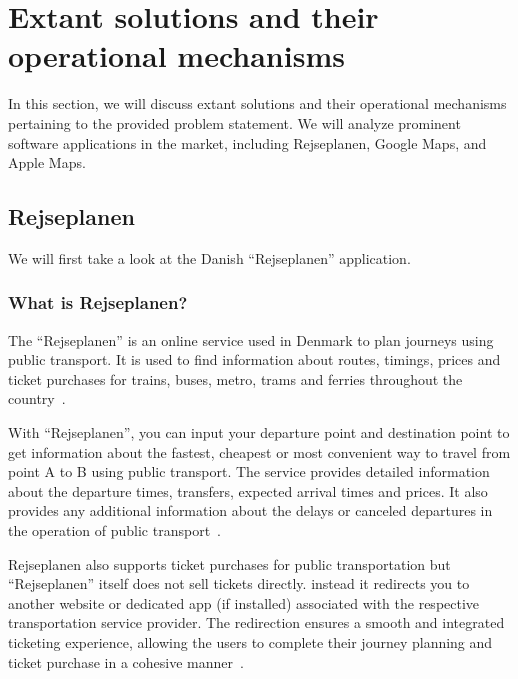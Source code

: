 \section{Extant solutions and their operational mechanisms}\label{sec:extant-solutions-and-their-operational-mechanisms}

In this section, we will discuss extant solutions and their operational mechanisms pertaining to the provided problem
statement.
We will analyze prominent software applications in the market, including Rejseplanen, Google Maps, and Apple Maps.

\subsection{Rejseplanen}\label{subsec:rejseplanen2}

We will first take a look at the Danish ``Rejseplanen'' application.

\subsubsection{What is Rejseplanen?}

The ``Rejseplanen'' is an online service used in Denmark to plan journeys using public transport.
It is used to find information about routes, timings, prices and ticket purchases for trains, buses, metro, trams and
ferries throughout the country~\cite{rejseplanen2023}.

With ``Rejseplanen'', you can input your departure point and destination point to get information about the fastest,
cheapest or most convenient way to travel from point A to B using public transport.
The service provides detailed information about the departure times, transfers, expected arrival times and prices.
It also provides any additional information about the delays or canceled departures in the operation of public
transport~\cite{rejseplanen2023}.

Rejseplanen also supports ticket purchases for public transportation but ``Rejseplanen'' itself does not sell tickets
directly.
instead it redirects you to another website or dedicated app (if installed) associated with the respective
transportation service provider.
The redirection ensures a smooth and integrated ticketing experience, allowing the users to complete their journey
planning and ticket purchase in a cohesive manner~\cite{rejseplanen2023}.

